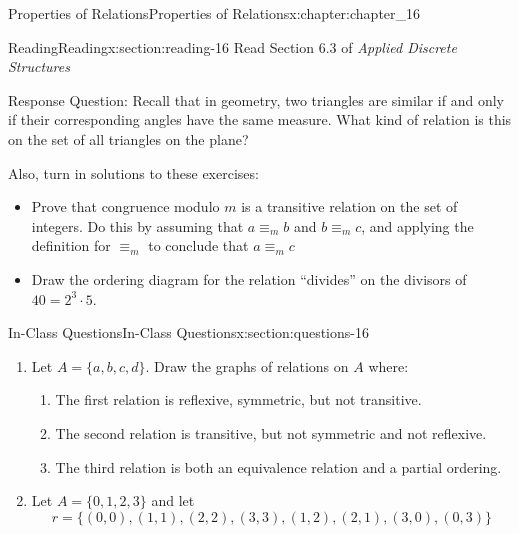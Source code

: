 \documentclass[oneside,10pt,]{book}
\numberwithin{equation}{section}
\begin{document}
\begin{chapterptx}{Properties of Relations}{}{Properties of Relations}{}{}{x:chapter:chapter_16}
\index{}%
%
%
\typeout{************************************************}
\typeout{************************************************}
%
\begin{sectionptx}{Reading}{}{Reading}{}{}{x:section:reading-16}
Read Section 6.3 of \emph{Applied Discrete Structures}%
\par
Response Question: Recall that in geometry, two triangles are similar if and only if their corresponding angles have the same measure. What kind of relation is this on the set of all triangles on the plane?%
\par
Also, turn in solutions to these exercises:%
\begin{itemize}[label=\textbullet]
\item{}Prove that congruence modulo \(m\) is a transitive relation on the set of integers. Do this by assuming that \(a \equiv_m b \) and \(b\equiv_m c\), and applying the definition for \(\equiv_m\) to conclude that \(a \equiv_m c\)%
\item{}Draw the ordering diagram for the relation ``divides'' on the divisors of \(40=2^3 \cdot 5\).%
\end{itemize}
%
\end{sectionptx}
%
%
\typeout{************************************************}
\typeout{************************************************}
%
\begin{sectionptx}{In-Class Questions}{}{In-Class Questions}{}{}{x:section:questions-16}
%
\begin{enumerate}[label=\arabic*.]
\item{}Let \(A = \{a, b, c, d\}\). Draw the graphs of relations on \(A\) where:%
\begin{enumerate}[label=(\alph*)]
\item{}The first relation is  reflexive, symmetric, but not transitive.%
\item{}The second relation is transitive, but not symmetric and not reflexive.%
\item{}The third relation is both an equivalence relation and a partial ordering.%
\end{enumerate}
%
\item{}Let \(A = \{0, 1, 2, 3\}\) and let%
\begin{equation*}
r = \{(0, 0), (1, 1), (2, 2), (3, 3), (1, 2), (2, 1), (3, 0), (0, 3)\}

\end{equation*}
\end{enumerate}
\end{sectionptx}
\end{chapterptx}
\end{document}
